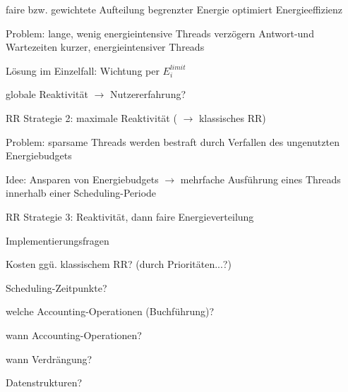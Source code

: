 \documentclass[a4paper]{article}
\begin{document}
\begin{multicols}{3}
\begin{itemize*}
\begin{itemize*}
        \end{itemize*}
        \item faire bzw. gewichtete Aufteilung begrenzter Energie optimiert Energieeffizienz
        \item Problem: lange, wenig energieintensive Threads verzögern Antwort-und Wartezeiten kurzer, energieintensiver Threads
        \begin{itemize*}
            \item Lösung im Einzelfall: Wichtung per $E_i^{limit}$
            \item globale Reaktivität $\rightarrow$ Nutzererfahrung?
        \end{itemize*}
        \item RR Strategie 2: maximale Reaktivität ( $\rightarrow$ klassisches RR)
        \item Problem: sparsame Threads werden bestraft durch Verfallen des ungenutzten Energiebudgets
        \item Idee: Ansparen von Energiebudgets $\rightarrow$ mehrfache Ausführung eines Threads innerhalb einer Scheduling-Periode
        \item RR Strategie 3: Reaktivität, dann faire Energieverteilung
    \end{itemize*}
    Implementierungsfragen
    \begin{itemize*}
        \item Kosten ggü. klassischem RR? (durch Prioritäten...?)
        \item Scheduling-Zeitpunkte?
        \begin{itemize*}
            \item welche Accounting-Operationen (Buchführung)?
            \item wann Accounting-Operationen?
            \item wann Verdrängung?
        \end{itemize*}
        \item Datenstrukturen?

\end{itemize*}
\end{multicols}
\end{document}
